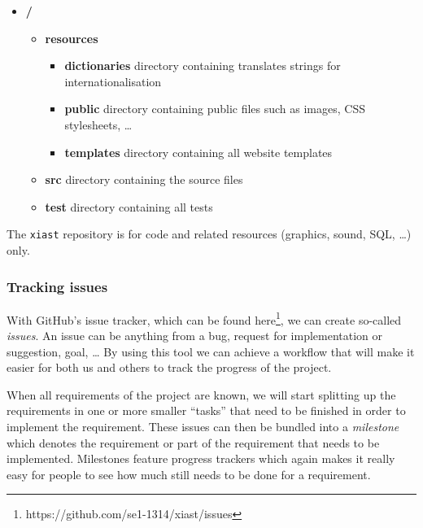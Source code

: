 \documentclass[12pt]{article}
\begin{document}
\begin{itemize}
\itemsep1pt\parskip0pt
\item
  \textbf{/}

  \begin{itemize}
  \itemsep1pt\parskip0pt
  \item
    \textbf{resources}

    \begin{itemize}
    \itemsep1pt\parskip0pt
    \item
      \textbf{dictionaries} directory containing translates strings for
      internationalisation
    \item
      \textbf{public} directory containing public files such as images,
      CSS stylesheets, \ldots{}
    \item
      \textbf{templates} directory containing all website templates
    \end{itemize}
  \item
    \textbf{src} directory containing the source files
  \item
    \textbf{test} directory containing all tests
  \end{itemize}
\end{itemize}

The \texttt{xiast} repository is for code and related resources
(graphics, sound, SQL, \ldots{}) only.

\subsubsection{Tracking issues}\label{tracking-issues}

With GitHub's issue tracker, which can be found here\footnote{https://github.com/se1-1314/xiast/issues}, we can create
so-called \emph{issues}. An issue can be anything from a bug, request
for implementation or suggestion, goal, \ldots{} By using this tool we
can achieve a workflow that will make it easier for both us and others
to track the progress of the project.

When all requirements of the project are known, we will start splitting
up the requirements in one or more smaller ``tasks'' that need to be
finished in order to implement the requirement. These issues can then be
bundled into a \emph{milestone} which denotes the requirement or part of
the requirement that needs to be implemented. Milestones feature
progress trackers which again makes it really easy for people to see how
much still needs to be done for a requirement.
\end{document}
